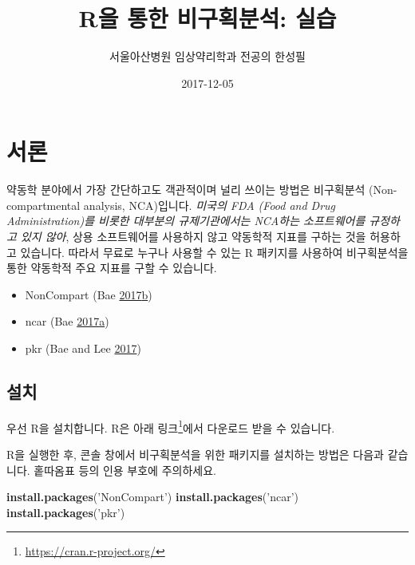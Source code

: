 \documentclass[9pt,]{krantz}
\title{R을 통한 비구획분석: 실습}
\author{서울아산병원 임상약리학과 전공의 한성필}
\date{2017-12-05}
\newenvironment{Shaded}{\begin{snugshade}}{\end{snugshade}}
\newcommand{\KeywordTok}[1]{\textcolor[rgb]{0.13,0.29,0.53}{\textbf{#1}}}
\newcommand{\StringTok}[1]{\textcolor[rgb]{0.31,0.60,0.02}{#1}}
\newcommand{\NormalTok}[1]{#1}
\providecommand{\tightlist}{%
  \setlength{\itemsep}{0pt}\setlength{\parskip}{0pt}}
\begin{document}
\maketitle

{
\hypersetup{linkcolor=black}
\setcounter{tocdepth}{2}
\tableofcontents
}
\mainmatter

\chapter{서론}\label{intro}

약동학 분야에서 가장 간단하고도 객관적이며 널리 쓰이는 방법은 비구획분석
(Non-compartmental analysis, NCA)입니다. \emph{미국의 FDA (Food and Drug
Administration)를 비롯한 대부분의 규제기관에서는 NCA하는 소프트웨어를
규정하고 있지 않아}, 상용 소프트웨어를 사용하지 않고 약동학적 지표를
구하는 것을 허용하고 있습니다. 따라서 무료로 누구나 사용할 수 있는 R
패키지를 사용하여 비구획분석을 통한 약동학적 주요 지표를 구할 수
있습니다.

\begin{itemize}
\tightlist
\item
  NonCompart (Bae
  \protect\hyperlink{ref-R-NonCompart}{2017}\protect\hyperlink{ref-R-NonCompart}{b})
\item
  ncar (Bae
  \protect\hyperlink{ref-R-ncar}{2017}\protect\hyperlink{ref-R-ncar}{a})
\item
  pkr (Bae and Lee \protect\hyperlink{ref-R-pkr}{2017})
\end{itemize}

\section{설치}

우선 R을 설치합니다. R은 아래 링크\footnote{\url{https://cran.r-project.org/}}에서
다운로드 받을 수 있습니다.

R을 실행한 후, 콘솔 창에서 비구획분석을 위한 패키지를 설치하는 방법은
다음과 같습니다. 홑따옴표 등의 인용 부호에 주의하세요.

\begin{Shaded}
\begin{Highlighting}[]
\KeywordTok{install.packages}\NormalTok{(}\StringTok{'NonCompart'}\NormalTok{)}
\KeywordTok{install.packages}\NormalTok{(}\StringTok{'ncar'}\NormalTok{)}
\KeywordTok{install.packages}\NormalTok{(}\StringTok{'pkr'}\NormalTok{)}
\end{Highlighting}
\end{Shaded}
\end{document}
